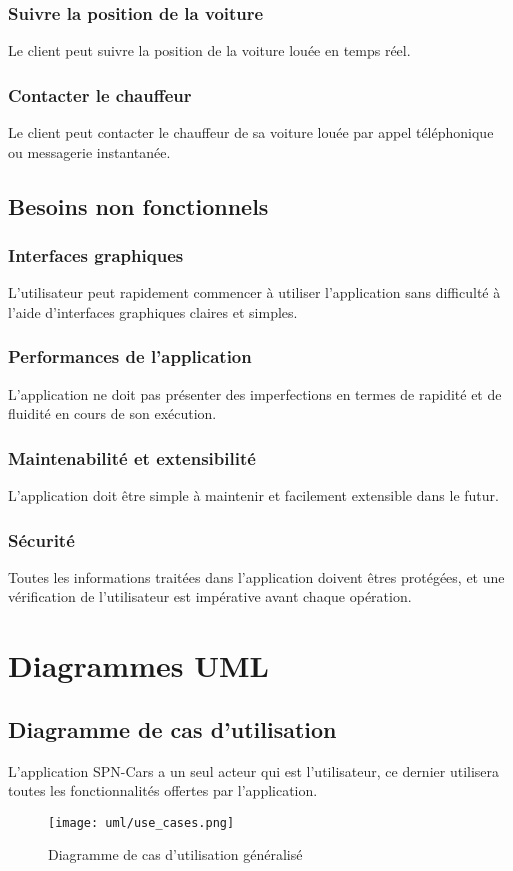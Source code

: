 \subsubsection{Suivre la position de la voiture}
Le client peut suivre la position de la voiture louée en temps réel.
\subsubsection{Contacter le chauffeur}
Le client peut contacter le chauffeur de sa voiture louée par appel téléphonique ou messagerie instantanée.
\subsection{Besoins non fonctionnels}
\subsubsection{Interfaces graphiques}
L'utilisateur peut rapidement commencer à utiliser l'application sans difficulté à l'aide d'interfaces graphiques claires et simples.
\subsubsection{Performances de l'application}
L'application ne doit pas présenter des imperfections en termes de rapidité et de fluidité en cours de son exécution.
\subsubsection{Maintenabilité et extensibilité}
L'application doit être simple à maintenir et facilement extensible dans le futur.
\subsubsection{Sécurité}
Toutes les informations traitées dans l'application doivent êtres protégées, et une vérification de l'utilisateur est impérative avant chaque opération.
\section{Diagrammes UML}
\subsection{Diagramme de cas d'utilisation}
L'application SPN-Cars a un seul acteur qui est l'utilisateur, ce dernier utilisera toutes les fonctionnalités offertes par l'application.
\begin{figure}[H]
    \centering
    \texttt{[image: uml/use\_cases.png]}
    \vspace{1cm}
    \captionsetup{justification=centering}
    \caption{Diagramme de cas d'utilisation généralisé}
    \label{fig:use_case_diag}
\end{figure}
